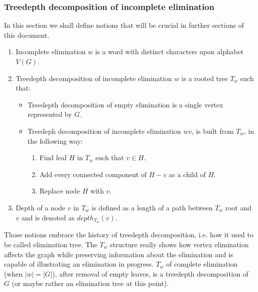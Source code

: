 \subsubsection{Treedepth decomposition of incomplete elimination}
In this section we shall define notions that will be crucial in further sections of this document.
\begin{enumerate}
	\item Incomplete elimination $w$ is a word with distinct characters upon alphabet $V(G)$.
	\item Treedepth decomposition of incomplete elimination $w$ is a rooted tree $T_w$ such that:
	\begin{itemize}
		\item Treedepth decomposition of empty elimination is a single vertex represented by $G$.
		\item Treedeph decomposition of incomplete elimination $wv$, is built from $T_w$, in the following way:
		\begin{enumerate}
			\item Find leaf $H$ in $T_w$ such that $v\in H$.
			\item Add every connected component of $H-v$ as a child of $H$.
			\item Replace node $H$ with $v$.
		\end{enumerate}
	\end{itemize}
	\item Depth of a node $v$ in $T_w$ is defined as a length of a path between $T_w$ root and $v$ and is denoted as $depth_{T_w}\left(v\right)$.
\end{enumerate}
Those notions embrace the history of treedepth decomposition, i.e. how it used to be called elimination tree. The $T_w$ structure really shows how vertex elimination affects the graph while preserving information about the elimination and is capable of illustrating an elimination in progress. $T_w$ of complete elimination (when $\left|w\right|=\left|G\right|$), after removal of empty leaves, is a treedepth decomposition of $G$ (or maybe rather an elimination tree at this point).
